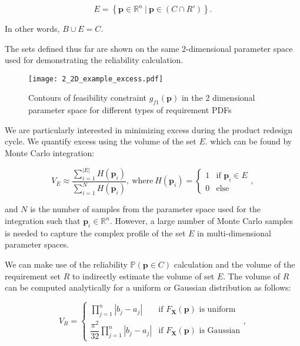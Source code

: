 \begin{equation} \label{eq:excess}
	\textit{E} = \left\{\mathbf{p} \in \mathbb{R}^n~|~\mathbf{p} \in \left(C\cap R'\right) \right\}.
\end{equation}

In other words, $B\cup E = C$.

The sets defined thus far are shown on the same 2-dimensional parameter space used for demonstrating the reliability calculation.

\begin{figure}[h!]
	\centering
	\texttt{[image: 2\_2D\_example\_excess.pdf]}
	\caption{Contours of feasibility constraint $g_{f1}(\mathbf{p})$ in the 2 dimensional parameter space for different types of requirement \acp{PDF}}
	\label{fig:2Dexampleexcess}
\end{figure}

We are particularly interested in minimizing excess during the product redesign cycle. We quantify excess using the volume of the set $E$. which can be found by Monte Carlo integration:

\begin{equation} \label{eq:excessmontecarlo}
	V_E \approx \dfrac{\sum\limits_{i=1}^{|{E}|} H\left(\mathbf{p}_i\right)}{\sum\limits_{i=1}^{N} H\left(\mathbf{p}_i\right)}, ~\mathrm{where}~ H\left(\mathbf{p}_i\right)={\begin{cases}1&{\text{if }}\mathbf{p}_i\in E\\0&{\text{else}}\end{cases}},
\end{equation}

and $N$ is the number of samples from the parameter space used for the integration such that $\mathbf{p}_i \in \mathbb{R}^n$. However, a large number of Monte Carlo samples is needed to capture the complex profile of the set $E$ in multi-dimensional parameter spaces.

We can make use of the reliability $\mathbb{P}(\mathbf{p} \in C)$ calculation and the volume of the requirement set $R$ to indirectly estimate the volume of set $E$. The volume of $R$ can be computed analytically for a uniform or Gaussian distribution as follows:

\begin{equation} \label{eq:Rmontecarlo}
	V_R = {\begin{cases} \prod\limits_{j=1}^{n} \left|b_j - a_j\right| &{\text{if }}F_\mathbf{X}(\mathbf{p})\text{ is uniform}\\\dfrac{\pi^2}{32}\prod\limits_{j=1}^{n} \left|b_j - a_j\right| &{\text{if }}F_\mathbf{X}(\mathbf{p})\text{ is Gaussian}\end{cases}},
\end{equation}

